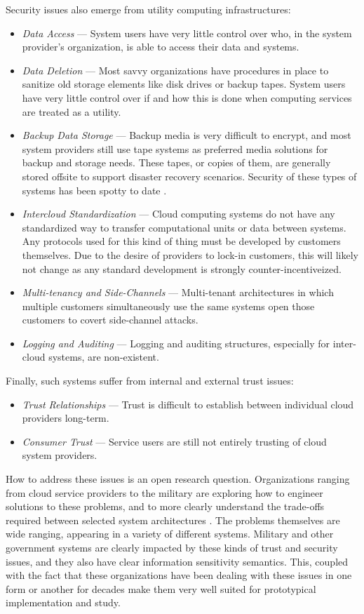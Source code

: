 \documentclass[12pt,letterpaper]{article}
\begin{document}
Security issues also emerge from utility computing infrastructures:
\begin{itemize}
\item \textit{Data Access} --- System users have very little control over who, in the system provider's organization, is able to access their data and systems.
\item \textit{Data Deletion} --- Most savvy organizations have procedures in place to sanitize old storage elements like disk drives or backup tapes.  System users have very little control over if and how this is done when computing services are treated as a utility.
\item \textit{Backup Data Storage} --- Backup media is very difficult to encrypt, and most system providers still use tape systems as preferred media solutions for backup and storage needs.  These tapes, or copies of them, are generally stored offsite to support disaster recovery scenarios.  Security of these types of systems has been spotty to date \cite{proposal:saic-breach-I,proposal:saic-breach-II,proposal:saic-breach-III}.
\item \textit{Intercloud Standardization} --- Cloud computing systems do not have any standardized way to transfer computational units or data between systems.  Any protocols used for this kind of thing must be developed by customers themselves.  Due to the desire of providers to lock-in customers, this will likely not change as any standard development is strongly counter-incentiveized. 
\item \textit{Multi-tenancy and Side-Channels} --- Multi-tenant architectures in which multiple customers simultaneously use the same systems open those customers to covert side-channel attacks.
\item \textit{Logging and Auditing} --- Logging and auditing structures, especially for inter-cloud systems, are non-existent.
\end{itemize}

Finally, such systems suffer from internal and external trust issues:
\begin{itemize}
\item \textit{Trust Relationships} --- Trust is difficult to establish between individual cloud providers long-term.
\item \textit{Consumer Trust} --- Service users are still not entirely trusting of cloud system providers.
\end{itemize}

How to address these issues is an open research question.  Organizations ranging from cloud service providers to the military are exploring how to engineer solutions to these problems, and to more clearly understand the trade-offs required between selected system architectures \cite{proposal:assured-info-sharing}.  The problems themselves are wide ranging, appearing in a variety of different systems.  Military and other government systems are clearly impacted by these kinds of trust and security issues, and they also have clear information sensitivity semantics.  This, coupled with the fact that these organizations have been dealing with these issues in one form or another for decades make them very well suited for prototypical implementation and study.
\end{document}
